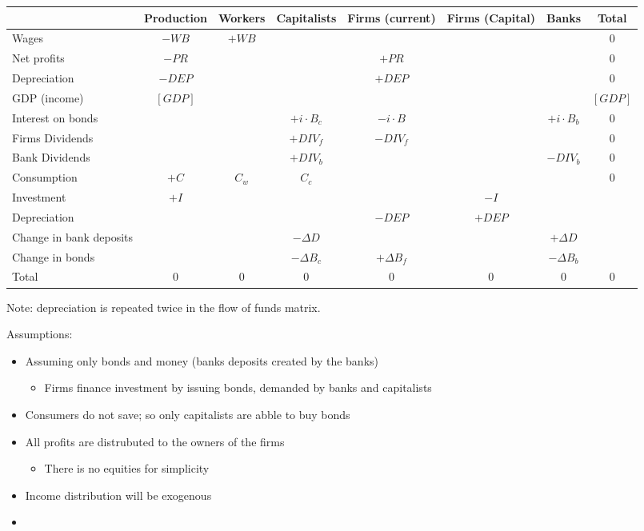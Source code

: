 \documentclass[11pt]{article}
\begin{document}
\begin{center}
\begin{tabular}{lccccccc}
\hline
 & Production & Workers & Capitalists & Firms (current) & Firms (Capital) & Banks & Total\\
\hline
Wages & \(-WB\) & \(+WB\) &  &  &  &  & 0\\
Net profits & \(-PR\) &  &  & \(+PR\) &  &  & 0\\
Depreciation & \(-DEP\) &  &  & \(+DEP\) &  &  & 0\\
\hline
GDP (income) & \([GDP]\) &  &  &  &  &  & \([GDP]\)\\
\hline
Interest on bonds &  &  & \(+i\cdot B_{c}\) & \(-i\cdot B\) &  & \(+i\cdot B_{b}\) & 0\\
Firms Dividends &  &  & \(+DIV_{f}\) & \(-DIV_{f}\) &  &  & 0\\
Bank Dividends &  &  & \(+DIV_{b}\) &  &  & \(-DIV_{b}\) & 0\\
\hline
Consumption & \(+C\) & \(C_{w}\) & \(C_{c}\) &  &  &  & 0\\
Investment & \(+I\) &  &  &  & \(-I\) &  & \\
Depreciation &  &  &  & \(-DEP\) & \(+DEP\) &  & \\
\hline
Change in bank deposits &  &  & \(-\Delta D\) &  &  & \(+\Delta D\) & \\
Change in bonds &  &  & \(-\Delta B_{c}\) & \(+\Delta B_{f}\) &  & \(-\Delta B_{b}\) & \\
\hline
Total & 0 & 0 & 0 & 0 & 0 & 0 & 0\\
\hline
\end{tabular}

\end{center}

Note: depreciation is repeated twice in the flow of funds matrix.

Assumptions:
\begin{itemize}
\item Assuming only bonds and money (banks deposits created by the banks)
\begin{itemize}
\item Firms finance investment by issuing bonds, demanded by banks and capitalists
\end{itemize}
\item Consumers do not save; so only capitalists are abble to buy bonds
\item All profits are distrubuted to the owners of the firms
\begin{itemize}
\item There is no equities for simplicity
\end{itemize}
\item Income distribution will be exogenous
\item 
\end{itemize}
\end{document}
